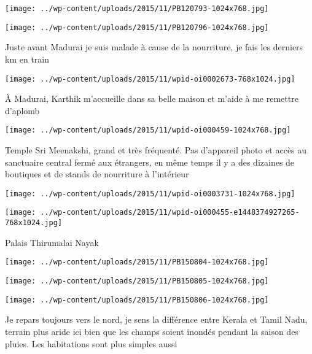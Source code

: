  \newline
 \newline
\centerline{\texttt{[image: ../wp-content/uploads/2015/11/PB120793-1024x768.jpg]} } 
 \newline
 \newline
\centerline{\texttt{[image: ../wp-content/uploads/2015/11/PB120796-1024x768.jpg]} } 
 \newline
 Juste avant Madurai je suis malade à cause de la nourriture, je fais les derniers km en train \newline
 \newline
\centerline{\texttt{[image: ../wp-content/uploads/2015/11/wpid-oi0002673-768x1024.jpg]} } 
 \newline
 À Madurai, Karthik m'accueille dans sa belle maison et m'aide à me remettre d'aplomb \newline
 \newline
\centerline{\texttt{[image: ../wp-content/uploads/2015/11/wpid-oi000459-1024x768.jpg]} } 
 \newline
 Temple Sri Meenakshi, grand et très fréquenté. Pas d'appareil photo et accès au sanctuaire central fermé aux étrangers, en même temps il y a des dizaines de boutiques et de stands de nourriture à l'intérieur \newline
 \newline
\centerline{\texttt{[image: ../wp-content/uploads/2015/11/wpid-oi0003731-1024x768.jpg]} } 
 \newline
 \newline
\centerline{\texttt{[image: ../wp-content/uploads/2015/11/wpid-oi000455-e1448374927265-768x1024.jpg]} } 
 \newline
 Palais Thirumalai Nayak \newline
 \newline
\centerline{\texttt{[image: ../wp-content/uploads/2015/11/PB150804-1024x768.jpg]} } 
 \newline
 \newline
\centerline{\texttt{[image: ../wp-content/uploads/2015/11/PB150805-1024x768.jpg]} } 
 \newline
 \newline
\centerline{\texttt{[image: ../wp-content/uploads/2015/11/PB150806-1024x768.jpg]} } 
 \newline
 Je repars toujours vers le nord, je sens la différence entre Kerala et Tamil Nadu, terrain plus aride ici bien que les champs soient inondés pendant la saison des pluies. Les habitations sont plus simples aussi \newline
